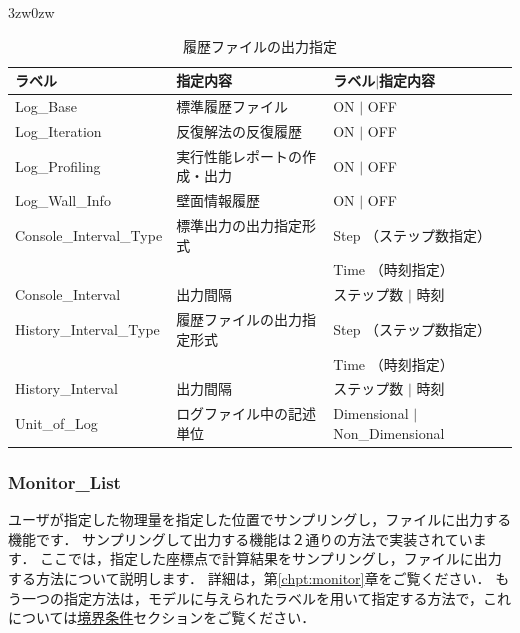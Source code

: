 \begin{indentation}{3zw}{0zw}
\begin{table}[htdp]
\caption{履歴ファイルの出力指定}
\begin{center}
\small
\begin{tabular}{lll} \toprule
ラベル & 指定内容 & ラベル$|$指定内容\\ \midrule
Log\_Base & 標準履歴ファイル & ON $|$ OFF\\
Log\_Iteration & 反復解法の反復履歴 & ON $|$ OFF\\
Log\_Profiling & 実行性能レポートの作成・出力 & ON $|$ OFF\\
Log\_Wall\_Info & 壁面情報履歴 & ON $|$ OFF\\ \hline
Console\_Interval\_Type & 標準出力の出力指定形式 & Step （ステップ数指定）\\
& & Time （時刻指定）\\
Console\_Interval & 出力間隔 & ステップ数 $|$ 時刻\\ \hline
History\_Interval\_Type & 履歴ファイルの出力指定形式 & Step （ステップ数指定）\\
& & Time （時刻指定）\\
History\_Interval & 出力間隔 & ステップ数 $|$ 時刻\\ \hline
Unit\_of\_Log & ログファイル中の記述単位 & Dimensional $|$ Non\_Dimensional\\\bottomrule
\end{tabular}
\end{center}
\label{tbl:log_output}
\end{table}

\end{indentation}





\pagebreak
\subsubsection{Monitor\_List}

ユーザが指定した物理量を指定した位置で\hypertarget{tgt:monitor_list}{サンプリング}し，ファイルに出力する機能です．
サンプリングして出力する機能は２通りの方法で実装されています．
ここでは，指定した座標点で計算結果をサンプリングし，ファイルに出力する方法について説明します．
詳細は，第\ref{chpt:monitor}章をご覧ください．
もう一つの指定方法は，モデルに与えられたラベルを用いて指定する方法で，これについては\hyperlink{tgt:localboundary}{境界条件}セクションをご覧ください．

